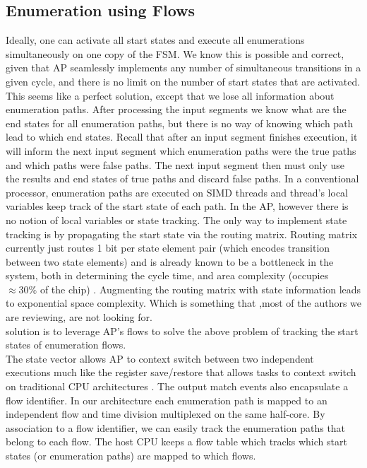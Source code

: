 \subsection{Enumeration using Flows}
Ideally, one can activate all start states and execute all enumerations simultaneously on one copy of the FSM. We know this is possible
and correct, given that AP seamlessly implements any number of
simultaneous transitions in a given cycle, and there is no limit on the
number of start states that are activated. This seems like a perfect
solution, except that we lose all information about enumeration paths.
After processing the input segments we know what are the end states
for all enumeration paths, but there is no way of knowing which path
lead to which end states. Recall that after an input segment finishes
execution, it will inform the next input segment which enumeration
paths were the true paths and which paths were false paths. The next
input segment then must only use the results and end states of true
paths and discard false paths.
In a conventional processor, enumeration paths are executed on
SIMD threads and thread’s local variables keep track of the start state
of each path. In the AP, however there is no notion of local variables
or state tracking. The only way to implement state tracking is by
propagating the start state via the routing matrix. Routing matrix
currently just routes 1 bit per state element pair (which encodes
transition between two state elements) and is already known to be a
bottleneck in the system, both in determining the cycle time, and area
complexity (occupies $≈30\%$ of the chip) \cite{1}. Augmenting the routing
matrix with state information leads to exponential space complexity.
Which is something that ,most of the authors we are reviewing, are not looking for.\\
\cite{1} solution is to leverage  AP's flows to solve the above problem of tracking the start states of enumeration flows.\\
The state vector allows AP
to context switch between two independent executions much like the
register save/restore that allows tasks to context switch on traditional
CPU architectures \cite{12}. The output match events also encapsulate
a flow identifier.
In our architecture each enumeration path is mapped to an independent flow and time division multiplexed on the same half-core.
By association to a flow identifier, we can easily track the enumeration paths that belong to each flow. The host CPU keeps a flow table
which tracks which start states (or enumeration paths) are mapped
to which flows.


